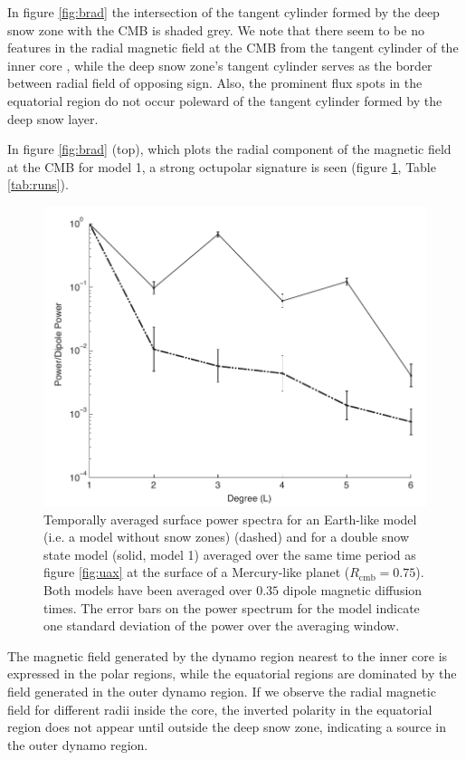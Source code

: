 In figure \ref{fig:brad} the intersection of the tangent cylinder formed by the deep snow zone with the CMB is shaded grey. We note that there seem to be no features in the radial magnetic field at the CMB from the tangent cylinder of the inner core \citep{stanleyfluxspot}, while the deep snow zone's tangent cylinder serves as the border between radial field of opposing sign. Also, the prominent flux spots in the equatorial region do not occur poleward of the tangent cylinder formed by the deep snow layer.

In figure \ref{fig:brad} (top), which plots the radial component of the magnetic field at the CMB for model 1, a strong octupolar signature is seen (figure \ref{fig:power}, Table \ref{tab:runs}).
\begin{figure}
	\centering
	\noindent\includegraphics[width=30pc]{Chapter4/figures/powermodel.pdf}
	\caption{Temporally averaged surface power spectra for an Earth-like model (i.e. a model without snow zones) (dashed) and for a double snow state model (solid, model 1) averaged over the same time period as figure \ref{fig:uax} at the surface of a Mercury-like planet ($R_{\mathrm{cmb}}=0.75$). Both models have been averaged over $0.35$ dipole magnetic diffusion times. The error bars on the power spectrum for the model indicate one standard deviation of the power over the averaging window.}
	\label{fig:power}
\end{figure}
The magnetic field generated by the dynamo region nearest to the inner core is expressed in the polar regions, while the equatorial regions are dominated by the field generated in the outer dynamo region. If we observe the radial magnetic field for different radii inside the core,  the inverted polarity in the equatorial region does not appear until outside the deep snow zone, indicating a source in the outer dynamo region.

